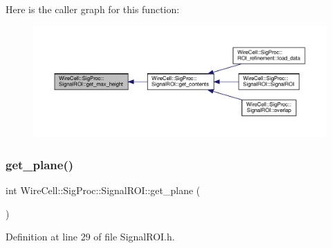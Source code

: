 Here is the caller graph for this function\+:
\nopagebreak
\begin{figure}[H]
\begin{center}
\leavevmode
\includegraphics[width=350pt]{class_wire_cell_1_1_sig_proc_1_1_signal_r_o_i_a32fab4e24000404a740a19813892e105_icgraph}
\end{center}
\end{figure}
\mbox{\label{class_wire_cell_1_1_sig_proc_1_1_signal_r_o_i_ab3dee5cfbcf601f4ac56bc7968c74fda}} 
\subsubsection{\texorpdfstring{get\+\_\+plane()}{get\_plane()}}
{\footnotesize\ttfamily int Wire\+Cell\+::\+Sig\+Proc\+::\+Signal\+R\+O\+I\+::get\+\_\+plane (\begin{DoxyParamCaption}{ }\end{DoxyParamCaption})\hspace{0.3cm}{\ttfamily [inline]}}



Definition at line 29 of file Signal\+R\+O\+I.\+h.

